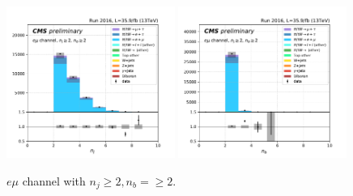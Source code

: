 \begin{figure}[ht]
    \includegraphics[width=0.49\textwidth]{chapters/Appendix/sectionPlots/figures/kinematics_pickles/emu2/2b/emu2_2b_nJets.pdf}
    \includegraphics[width=0.49\textwidth]{chapters/Appendix/sectionPlots/figures/kinematics_pickles/emu2/2b/emu2_2b_nBJets.pdf}
    
    \caption{$e\mu$ channel with $n_j\geq2, n_b=\geq2$.}
\end{figure}


